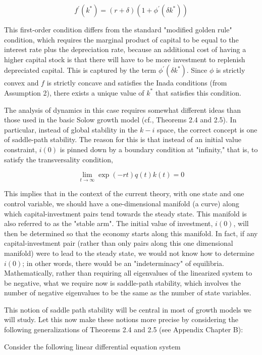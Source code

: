 \documentclass[\topdir/lecture_notes.tex]{subfiles}
\begin{document}
\[
f^{\prime}\left(k^{*}\right)=(r+\delta)\left(1+\phi^{\prime}\left(\delta k^{*}\right)\right)
\]

This first-order condition differs from the standard "modified golden rule" condition, which requires the marginal product of capital to be equal to the interest rate plus the depreciation rate, because an additional cost of having a higher capital stock is that there will have to be more investment to replenish depreciated capital. This is captured by the term $\phi^{\prime}\left(\delta k^{*}\right)$. Since $\phi$ is strictly convex and $f$ is strictly concave and satisfies the Inada conditions (from Assumption 2), there exists a unique value of $k^{*}$ that satisfies this condition.

The analysis of dynamics in this case requires somewhat different ideas than those used in the basic Solow growth model (cf., Theorems 2.4 and 2.5). In particular, instead of global stability in the $k-i$ space, the correct concept is one of saddle-path stability. The reason for this is that instead of an initial value constraint, $i(0)$ is pinned down by a boundary condition at "infinity," that is, to satisfy the transversality condition,

\[
\lim _{t \rightarrow \infty} \exp (-r t) q(t) k(t)=0
\]

This implies that in the context of the current theory, with one state and one control variable, we should have a one-dimensional manifold (a curve) along which capital-investment pairs tend towards the steady state. This manifold is also referred to as the "stable arm". The initial value of investment, $i(0)$, will then be determined so that the economy starts along this manifold. In fact, if any capital-investment pair (rather than only pairs along this one dimensional manifold) were to lead to the steady state, we would not know how to determine $i(0)$; in other words, there would be an "indeterminacy" of equilibria. Mathematically, rather than requiring all eigenvalues of the linearized system to be negative, what we require now is saddle-path stability, which involves the number of negative eigenvalues to be the same as the number of state variables.

This notion of saddle path stability will be central in most of growth models we will study. Let this now make these notions more precise by considering the following generalizations of Theorems 2.4 and 2.5 (see Appendix Chapter B):

\begin{theorem}
Consider the following linear differential equation system
\end{theorem}
\end{document}
